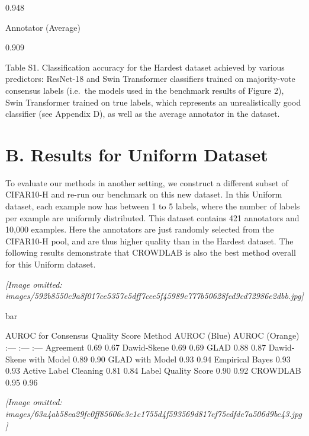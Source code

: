 \documentclass[
]{article}
\begin{document}
0.948

Annotator (Average)

0.909

Table S1. Classification accuracy for the Hardest dataset achieved by
various predictors: ResNet-18 and Swin Transformer classifiers trained
on majority-vote consensus labels (i.e.~the models used in the benchmark
results of Figure 2), Swin Transformer trained on true labels, which
represents an unrealistically good classifier (see Appendix D), as well
as the average annotator in the dataset.

\section{B. Results for Uniform
Dataset}\label{b.-results-for-uniform-dataset}

To evaluate our methods in another setting, we construct a different
subset of CIFAR10-H and re-run our benchmark on this new dataset. In
this Uniform dataset, each example now has between 1 to 5 labels, where
the number of labels per example are uniformly distributed. This dataset
contains 421 annotators and 10,000 examples. Here the annotators are
just randomly selected from the CIFAR10-H pool, and are thus higher
quality than in the Hardest dataset. The following results demonstrate
that CROWDLAB is also the best method overall for this Uniform dataset.

\textit{[Image omitted: images/592b8550c9a8f017ce5357e5dff7cee5f45989c777b50628fed9cd72986e2dbb.jpg]}

bar

AUROC for Consensus Quality Score \textbar{} Method \textbar{} AUROC
(Blue) \textbar{} AUROC (Orange) \textbar{} \textbar{} :--- \textbar{}
:--- \textbar{} :--- \textbar{} \textbar{} Agreement \textbar{} 0.69
\textbar{} 0.67 \textbar{} \textbar{} Dawid-Skene \textbar{} 0.69
\textbar{} 0.69 \textbar{} \textbar{} GLAD \textbar{} 0.88 \textbar{}
0.87 \textbar{} \textbar{} Dawid-Skene with Model \textbar{} 0.89
\textbar{} 0.90 \textbar{} \textbar{} GLAD with Model \textbar{} 0.93
\textbar{} 0.94 \textbar{} \textbar{} Empirical Bayes \textbar{} 0.93
\textbar{} 0.93 \textbar{} \textbar{} Active Label Cleaning \textbar{}
0.81 \textbar{} 0.84 \textbar{} \textbar{} Label Quality Score
\textbar{} 0.90 \textbar{} 0.92 \textbar{} \textbar{} CROWDLAB
\textbar{} 0.95 \textbar{} 0.96 \textbar{}

\textit{[Image omitted: images/63a4ab58ea29fc0ff85606e3c1c1755d4f593569d817ef75edfde7a506d9bc43.jpg]}
\end{document}
